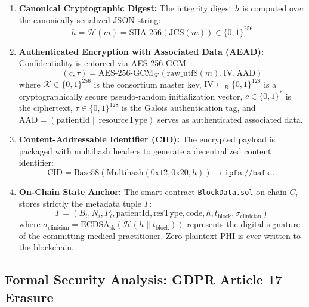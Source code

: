 \documentclass[journal]{IEEEtran}
\theoremstyle{definition}
\begin{document}
\begin{enumerate}
    \item \textbf{Canonical Cryptographic Digest:}
    The integrity digest $h$ is computed over the canonically serialized JSON string:
    \begin{equation}
    h = \mathcal{H}(m) = \text{SHA-256}(\text{JCS}(m)) \in \{0, 1\}^{256}
    \end{equation}
    \item \textbf{Authenticated Encryption with Associated Data (AEAD):}
    Confidentiality is enforced via AES-256-GCM~\cite{dworkin2007recommendation, bellare2000authenticated}:
    \begin{equation}
    (c, \tau) = \text{AES-256-GCM}_{\mathcal{K}}(\text{raw\_utf8}(m), \text{IV}, \text{AAD})
    \end{equation}
    where $\mathcal{K} \in \{0, 1\}^{256}$ is the consortium master key, $\text{IV} \leftarrow_R \{0, 1\}^{128}$ is a cryptographically secure pseudo-random initialization vector, $c \in \{0,1\}^*$ is the ciphertext, $\tau \in \{0, 1\}^{128}$ is the Galois authentication tag, and $\text{AAD} = (\text{patientId} \parallel \text{resourceType})$ serves as authenticated associated data.
    \item \textbf{Content-Addressable Identifier (CID):}
    The encrypted payload is packaged with multihash headers to generate a decentralized content identifier:
    \begin{equation}
    \text{CID} = \text{Base58}(\text{Multihash}(0\text{x}12, 0\text{x}20, h)) \rightarrow \texttt{ipfs://bafk...}
    \end{equation}
    \item \textbf{On-Chain State Anchor:}
    The smart contract \texttt{BlockData.sol} on chain $C_i$ stores strictly the metadata tuple $\Gamma$:
    \begin{equation}
    \Gamma = \left(B_i, N_i, P_i, \text{patientId}, \text{resType}, \text{code}, h, t_{\text{block}}, \sigma_{\text{clinician}}\right)
    \end{equation}
    where $\sigma_{\text{clinician}} = \text{ECDSA}_{\text{sk}}(\mathcal{H}(h \parallel t_{\text{block}}))$ represents the digital signature of the committing medical practitioner. Zero plaintext PHI is ever written to the blockchain.
\end{enumerate}

\subsection{Formal Security Analysis: GDPR Article 17 Erasure}
\end{document}
